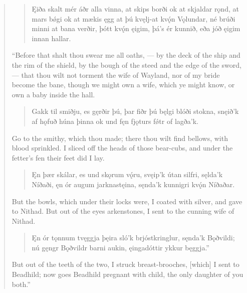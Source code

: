 \begin{verse}
\begin{verse}
\bva Ęiða skalt mér áðr \hld alla vinna,
at skips borði \hld ok at skjaldar rǫnd,
at mars bǿgi \hld ok at mækis ęgg
at þú kvęlj-at \hld kvǫ́n Vǫlundar,
né brúði minni \hld at bana verðir,
þótt kvǫ́n ęigim, \hld þá’s ér kunnið,
eða jóð ęigim \hld innan hallar. \\%
\end{verse}

\bvb “Before that shalt thou swear me all oaths, — by the deck of the ship and the rim of the shield, by the bough of the steed and the edge of the sword, — that thou wilt not torment the wife of Wayland, nor of my bride become the bane, though we might own a wife, which ye might know, or own a baby inside the hall.\footnotemark[1]

\begin{verse}
\bva Gakk til smiðju, \hld es gęrðir þú,
þar fiðr þú bęlgi \hld blóði stokna,
snęið’k af hǫfuð \hld húna þinna
ok und fęn fjǫturs \hld fǿtr of lagða’k. \\%
\end{verse}

\bvb Go to the smithy, which thou made; there thou wilt find bellows, with blood sprinkled. I sliced off the heads of those bear-cubs, and under the fetter’s fen their feet did I lay.

\begin{verse}
\bva Ęn þær skálar, \hld es und skǫrum vǫ́ru,
svęip’k útan silfri, \hld sęlda’k Níðaði,
ęn ór augum \hld jarknastęina,
sęnda'k kunnigri \hld kvǫ́n Níðaðar. \\%
\end{verse}

\bvb But the bowls, which under their locks were, I coated with silver, and gave to Nithad. But out of the eyes arkenstones, I sent to the cunning wife of Nithad.

\begin{verse}
\bva Ęn ór tǫnnum \hld tvęggja þęira
sló’k brjóstkringlur, \hld sęnda’k Bǫðvildi;
nú gęngr Bǫðvildr \hld barni aukin,
ęingadóttir \hld ykkur bęggja.” \\%
\end{verse}

\bvb But out of the teeth of the two, I struck breast-brooches, [which] I sent to Beadhild; now goes Beadhild pregnant with child, the only daughter of you both.”


\end{verse}
